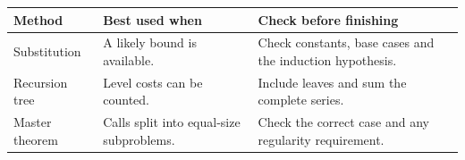 \documentclass[12pt,a4paper]{article}
\begin{document}
\begin{tcolorbox}[tikzbox, title={Summary Comparison}]
\par\vspace{5pt}
\begingroup
\setlength{\extrarowheight}{1pt}
\noindent\begin{tabularx}{\linewidth}{|B{3.45cm}|Y|Y|}
\hline
\textbf{Method} & \textbf{Best used when} & \textbf{Check before finishing} \\ \hline
Substitution & A likely bound is available. & Check constants, base cases and the induction hypothesis. \\ \hline
Recursion tree & Level costs can be counted. & Include leaves and sum the complete series. \\ \hline
Master theorem & Calls split into equal-size subproblems. & Check the correct case and any regularity requirement. \\ \hline
\end{tabularx}\par
\endgroup
\end{tcolorbox}
\end{document}
